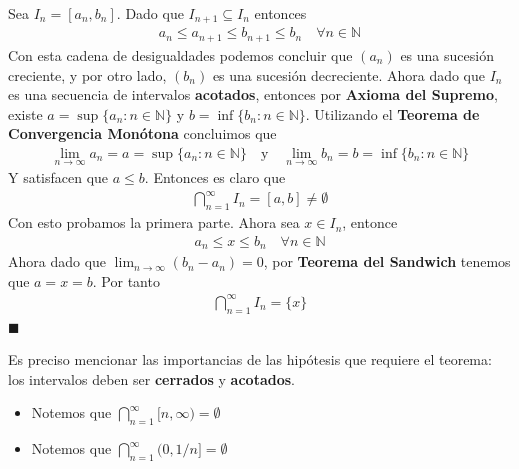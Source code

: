 \documentclass[12pt]{book}
\renewenvironment{proof}[1][\textit{Demostración}]{%
  \par\noindent{\bfseries #1.}\enspace}{\hfill$\blacksquare$\par}
\begin{document}
\begin{proof}
    Sea $I_n= [a_n,b_n]$. Dado que $I_{n+1} \subseteq I_n$ entonces 
    \begin{align*}
        a_n \leq a_{n+1}\leq b_{n+1}\leq b_n \quad \forall n \in \mathbb{N}
    \end{align*}
    Con esta cadena de desigualdades podemos concluir que $(a_n)$ es una sucesión creciente, y por otro lado, $(b_n)$ es una sucesión decreciente. Ahora dado que $I_n$ es una secuencia de intervalos \textbf{acotados}, entonces por \textbf{Axioma del Supremo}, existe $a=\sup\{a_n:n \in \mathbb{N}\}$ y $b=\inf\{b_n : n \in \mathbb{N}\}$. Utilizando el \textbf{Teorema de Convergencia Monótona} concluimos que
    \begin{align*}
        \lim_{n \to \infty}a_n = a =\sup\{a_n:n \in \mathbb{N}\} \quad \text{y} \quad \lim_{n \to \infty}b_n=b =\inf\{b_n : n \in \mathbb{N}\}
    \end{align*}
    Y satisfacen que $a\leq b$. Entonces es claro que
    \begin{align*}
        \bigcap_{n=1}^\infty I_n=[a,b] \neq \emptyset
    \end{align*}
    Con esto probamos la primera parte. Ahora sea $x \in I_n$, entonce
    \begin{align*}
        a_n \leq x \leq b_n \quad \forall n \in \mathbb{N}
    \end{align*}
    Ahora dado que $\displaystyle \lim_{n \to \infty}( b_n -a_n)=0$, por \textbf{Teorema del Sandwich} tenemos que $a=x=b$. Por tanto
    \begin{align*}
        \bigcap_{n=1}^\infty I_n =\{x \}
    \end{align*}
\end{proof}
\begin{eje}{}{}
    Es preciso mencionar las importancias de las hipótesis que requiere el teorema: los intervalos deben ser \textbf{cerrados} y \textbf{acotados}.
    \begin{itemize}
        \item Notemos que $\displaystyle \bigcap_{n=1}^\infty [n, \infty)= \emptyset$
        \item Notemos que $\displaystyle \bigcap_{n=1}^\infty (0,1/n]= \emptyset$
    \end{itemize}
\end{eje}
\end{document}
